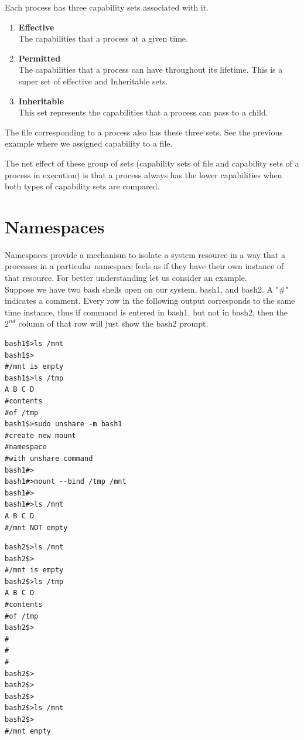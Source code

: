 \documentclass[twoside]{iitbreport}
\begin{document}
Each process has three capability sets associated with it.
\begin{enumerate}
\item \textbf{Effective}\\
The capabilities that a process at a given time.
\item \textbf{Permitted}\\
The capabilities that a process can have throughout its lifetime. This is a super set of effective and Inheritable sets.
\item \textbf{Inheritable}\\
This set represents the capabilities that a process can pass to a child.
\end{enumerate}

The file corresponding to a process also has these three sets. See the previous example where we assigned capability to a file.

The net effect of these group of sets (capability sets of file and capability sets of a process in execution) is that a process always has the lower capabilities when both types of capability sets are compared.

\section{Namespaces}
Namespaces provide a mechanism to isolate a system resource in a way that a processes in a particular namespace feels as if they have their own instance of that resource. For better understanding let us consider an example.\\
Suppose we have two bash shells open on our system, bash1, and bash2. A "\#" indicates a comment. Every row in the following output corresponds to the same time instance, thus if command is entered in bash1, but not in bash2, then the $2^{nd}$ column of that row will just show the bash2 prompt.\\

\begin{multicols}{2}
\begin{lstlisting}
bash1$>ls /mnt
bash1$>
#/mnt is empty
bash1$>ls /tmp
A B C D
#contents
#of /tmp
bash1$>sudo unshare -m bash1
#create new mount 
#namespace 
#with unshare command
bash1#>
bash1#>mount --bind /tmp /mnt
bash1#>
bash1#>ls /mnt
A B C D
#/mnt NOT empty
\end{lstlisting}
\columnbreak
\begin{lstlisting}
bash2$>ls /mnt
bash2$>
#/mnt is empty
bash2$>ls /tmp
A B C D
#contents
#of /tmp
bash2$>
#
#
#
bash2$>
bash2$>
bash2$>
bash2$>ls /mnt
bash2$>
#/mnt empty
\end{lstlisting}
\end{multicols}
\end{document}
